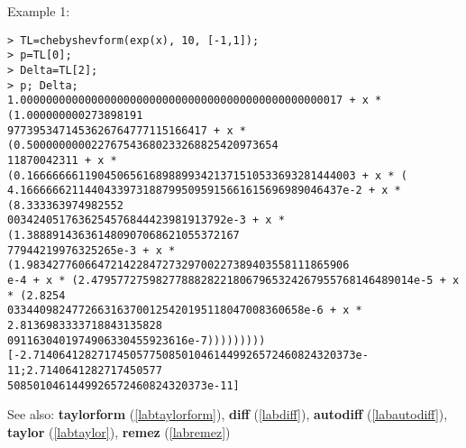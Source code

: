 \noindent Example 1: 
\begin{center}\begin{minipage}{15cm}\begin{Verbatim}[frame=single]
> TL=chebyshevform(exp(x), 10, [-1,1]);
> p=TL[0];
> Delta=TL[2];
> p; Delta;
1.00000000000000000000000000000000000000000000000017 + x * (1.000000000273898191
9773953471453626764777115166417 + x * (0.500000000022767543680233268825420973654
11870042311 + x * (0.166666661190450656168988993421371510533693281444003 + x * (
4.16666662114404339731887995095915661615696989046437e-2 + x * (8.333363974982552
0034240517636254576844423981913792e-3 + x * (1.388891436361480907068621055372167
77944219976325265e-3 + x * (1.98342776066472142284727329700227389403558111865906
e-4 + x * (2.47957727598277888282218067965324267955768146489014e-5 + x * (2.8254
0334409824772663163700125420195118047008360658e-6 + x * 2.8136983333718843135828
0911630401974906330455923616e-7)))))))))
[-2.71406412827174505775085010461449926572460824320373e-11;2.7140641282717450577
5085010461449926572460824320373e-11]
\end{Verbatim}
\end{minipage}\end{center}
See also: \textbf{taylorform} (\ref{labtaylorform}), \textbf{diff} (\ref{labdiff}), \textbf{autodiff} (\ref{labautodiff}), \textbf{taylor} (\ref{labtaylor}), \textbf{remez} (\ref{labremez})
